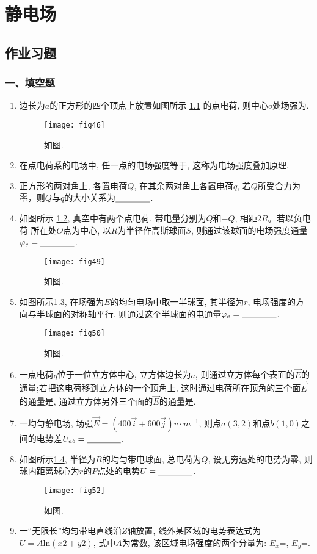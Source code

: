 \chapter{静电场}
\section{作业习题}
\subsection*{一、填空题}
\begin{enumerate}
    \item 边长为$a$的正方形的四个顶点上放置如图所示 \ref{fig:46} 的点电荷, 则中心$o$处场强为\nl.
    \begin{figure}[H]
        \centering
        \texttt{[image: fig46]}
        \caption{如图.}\label{fig:46}
    \end{figure}
    \item 在点电荷系的电场中, 任一点的电场强度等于\nl, 这称为电场强度叠加原理.
    \item 正方形的两对角上, 各置电荷$Q$, 在其余两对角上各置电荷$q$, 若$Q$所受合力为零，则$Q$与$q$的大小关系为$\nl$.
    \item   如图所示 \ref{fig:49}, 真空中有两个点电荷, 带电量分别为$Q$和$-Q$, 相距$2R$。若以负电荷
    所在处$O$点为中心, 以$R$为半径作高斯球面$S$, 则通过该球面的电场强度通量$\varphi_e=\nl$. 
    \begin{figure}[H]
        \centering
        \texttt{[image: fig49]}
        \caption{如图.}\label{fig:49}
    \end{figure}
    \item 如图所示\ref{fig:50}, 在场强为$E$的均匀电场中取一半球面, 其半径为$r$, 电场强度的方向与半球面的对称轴平行. 则通过这个半球面的电通量$\varphi_e=\nl$.
    \begin{figure}[H]
        \centering
        \texttt{[image: fig50]}
        \caption{如图.}\label{fig:50}
    \end{figure}
    \item 一点电荷$q$位于一位立方体中心, 立方体边长为$a$, 则通过立方体每个表面的$\vec{E}$的通量\nl;若把这电荷移到立方体的一个顶角上, 这时通过电荷所在顶角的三个面$\vec{E}$的通量是\nl, 通过立方体另外三个面的$\vec{E}$的通量是\nl.
    \item 一均匀静电场, 场强$\vec{E}=(400\vec{i}+600\vec{j})v\cdot m^{-1}$, 则点$a(3, 2)$和点$b(1, 0)$之间的电势差$U_{ab}=\nl$.
    \item 如图所示\ref{fig:52}, 半径为$R$的均匀带电球面, 总电荷为$Q$, 设无穷远处的电势为零, 则球内距离球心为$r$的$P$点处的电势$U=\nl$. 
    \begin{figure}[H]
        \centering
        \texttt{[image: fig52]}
        \caption{如图.}\label{fig:52}
    \end{figure}
    \item 一“无限长”均匀带电直线沿$Z$轴放置, 线外某区域的电势表达式为$U=A\mathrm{ln}(x2+y2)$, 式中$A$为常数, 该区域电场强度的两个分量为: $E_x$=\nl, $E_y$=\nl.
\end{enumerate}
